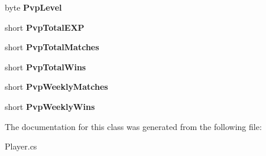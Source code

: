 \begin{DoxyCompactItemize}
\item 
\hypertarget{classffxivlib_1_1_player_a85ae6e29ccf2a6f98015723914836901}{byte {\bfseries Pvp\-Level}}\label{classffxivlib_1_1_player_a85ae6e29ccf2a6f98015723914836901}

\item 
\hypertarget{classffxivlib_1_1_player_a66f9dce14c026d2f0f380dcbeca1b607}{short {\bfseries Pvp\-Total\-E\-X\-P}}\label{classffxivlib_1_1_player_a66f9dce14c026d2f0f380dcbeca1b607}

\item 
\hypertarget{classffxivlib_1_1_player_add17281f875038b50842e4d4247820d6}{short {\bfseries Pvp\-Total\-Matches}}\label{classffxivlib_1_1_player_add17281f875038b50842e4d4247820d6}

\item 
\hypertarget{classffxivlib_1_1_player_a817c476d591480d56d7d87b62b51f2b5}{short {\bfseries Pvp\-Total\-Wins}}\label{classffxivlib_1_1_player_a817c476d591480d56d7d87b62b51f2b5}

\item 
\hypertarget{classffxivlib_1_1_player_ab6207d25a5ff65e56770aa9a4ca83d6c}{short {\bfseries Pvp\-Weekly\-Matches}}\label{classffxivlib_1_1_player_ab6207d25a5ff65e56770aa9a4ca83d6c}

\item 
\hypertarget{classffxivlib_1_1_player_a36221ab0f9f8e5a2c28a17826c3bd256}{short {\bfseries Pvp\-Weekly\-Wins}}\label{classffxivlib_1_1_player_a36221ab0f9f8e5a2c28a17826c3bd256}

\end{DoxyCompactItemize}


The documentation for this class was generated from the following file\-:\begin{DoxyCompactItemize}
\item 
Player.\-cs\end{DoxyCompactItemize}
